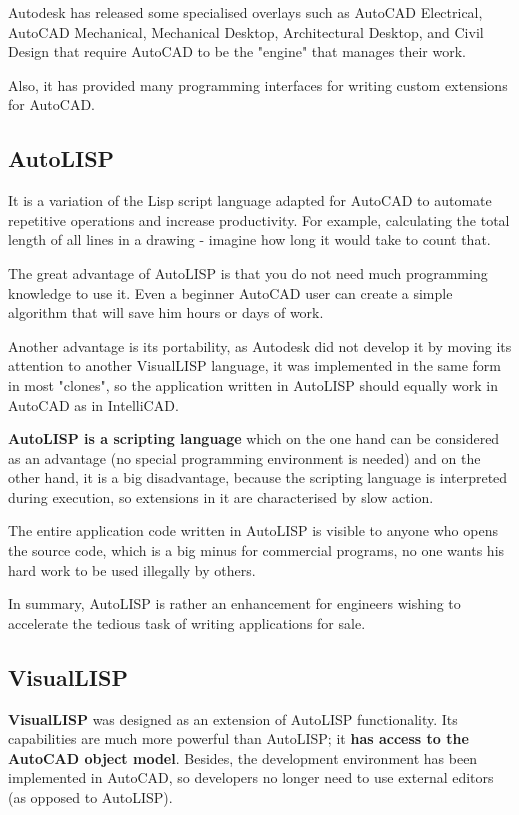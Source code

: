 \documentclass[a4paper, 11pt, article]{report}
\begin{document}
Autodesk has released some specialised overlays such as AutoCAD Electrical, AutoCAD Mechanical, Mechanical Desktop, Architectural Desktop, and Civil Design that require AutoCAD to be the "engine" that manages their work.

Also, it has provided many programming interfaces for writing custom extensions for AutoCAD.

\subsection{AutoLISP}

It is a variation of the Lisp script language adapted for AutoCAD to automate repetitive operations and increase productivity. For example, calculating the total length of all lines in a drawing - imagine how long it would take to count that.

The great advantage of AutoLISP is that you do not need much programming knowledge to use it. Even a beginner AutoCAD user can create a simple algorithm that will save him hours or days of work.

Another advantage is its portability, as Autodesk did not develop it by moving its attention to another VisualLISP language, it was implemented in the same form in most "clones", so the application written in AutoLISP should equally work in AutoCAD as in IntelliCAD.

\textbf{AutoLISP is a scripting language} which on the one hand can be considered as an advantage (no special programming environment is needed) and on the other hand, it is a big disadvantage, because the scripting language is interpreted during execution, so extensions in it are characterised by slow action.

The entire application code written in AutoLISP is visible to anyone who opens the source code, which is a big minus for commercial programs, no one wants his hard work to be used illegally by others.

In summary, AutoLISP is rather an enhancement for engineers wishing to accelerate the tedious task of writing applications for sale.

\subsection{VisualLISP}

\textbf{VisualLISP} was designed as an extension of AutoLISP functionality. Its capabilities are much more powerful than AutoLISP; it \textbf{has access to the AutoCAD object model}. Besides, the development environment has been implemented in AutoCAD, so developers no longer need to use external editors (as opposed to AutoLISP).
\end{document}

